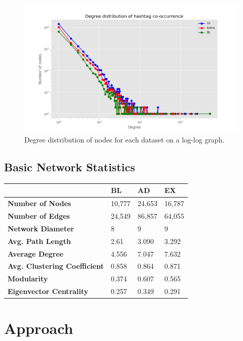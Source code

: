 \documentclass[conference]{IEEEtran}
\begin{document}
	\begin{figure}[htbp]
		\centerline{\includegraphics[width=\linewidth]{./images/degree_distribution.png}}
		\caption{Degree distribution of nodes for each dataset on a log-log graph.}
		\label{degree_distribution}
	\end{figure}
	
	\subsection{Basic Network Statistics}
		\begin{tabularx}{0.95\linewidth}{| l | X | X | X |}
			\hline
			 \, & \textbf{BL} & \textbf{AD} & \textbf{EX} \\ \hline
			 \textbf{Number of Nodes} & 10,777 & 24,653 & 16,787 \\ \hline
			 \textbf{Number of Edges} & 24,549 & 86,857 & 64,055 \\ \hline
			 \textbf{Network Diameter} & 8 & 9 & 9 \\ \hline
			 \textbf{Avg. Path Length} & 2.61 & 3.090 & 3.292 \\ \hline
			 \textbf{Average Degree} & 4.556 & 7.047 & 7.632 \\ \hline
			 \textbf{Avg. Clustering Coefficient} & 0.858 & 0.864 & 0.871 \\ \hline
			 \textbf{Modularity} & 0.374 & 0.607 & 0.565 \\ \hline
			 \textbf{Eigenvector Centrality} & 0.257 & 0.349 & 0.291 \\ \hline
		\end{tabularx}

\section{Approach}
\end{document}

